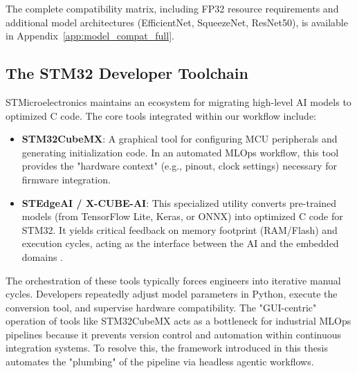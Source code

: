The complete compatibility matrix, including FP32 resource requirements and additional model architectures (EfficientNet, SqueezeNet, ResNet50), is available in Appendix~\ref{app:model_compat_full}.

\subsection{The STM32 Developer Toolchain}
STMicroelectronics maintains an ecosystem for migrating high-level AI models to optimized C code. The core tools integrated within our workflow include:

\begin{itemize}
    \item \textbf{STM32CubeMX}: A graphical tool for configuring MCU peripherals and generating initialization code. In an automated MLOps workflow, this tool provides the "hardware context" (e.g., pinout, clock settings) necessary for firmware integration.
    \item \textbf{STEdgeAI / X-CUBE-AI}: This specialized utility converts pre-trained models (from TensorFlow Lite, Keras, or ONNX) into optimized C code for STM32. It yields critical feedback on memory footprint (RAM/Flash) and execution cycles, acting as the interface between the AI and the embedded domains \cite{st_cubeai_docs}.
\end{itemize}

The orchestration of these tools typically forces engineers into iterative manual cycles. Developers repeatedly adjust model parameters in Python, execute the conversion tool, and supervise hardware compatibility. The "GUI-centric" operation of tools like STM32CubeMX acts as a bottleneck for industrial MLOps pipelines because it prevents version control and automation within continuous integration systems. To resolve this, the framework introduced in this thesis automates the "plumbing" of the pipeline via headless agentic workflows.
